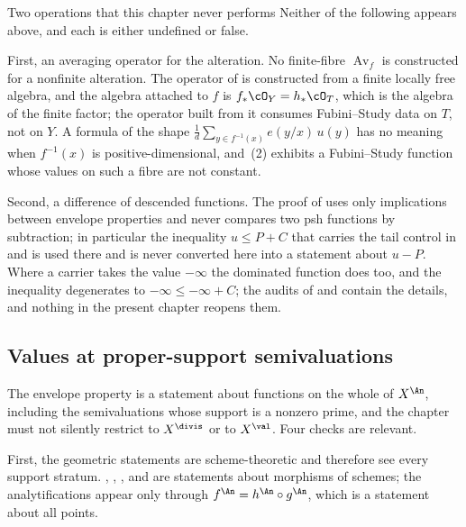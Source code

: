 \begin{warning}{Two operations that this chapter never performs}
\label{warn:ch42-forbidden}
Neither of the following appears above, and each is either undefined or
false.

First, an averaging operator for the alteration.  No finite-fibre
$\operatorname{Av}_f$ is constructed for a nonfinite alteration.  The operator of 
is constructed from a finite locally free algebra, and the algebra attached
to $f$ is $f_*\cO_Y=h_*\cO_T$, which is the algebra of the finite
factor; the operator built from it consumes Fubini--Study data on $T$, not
on $Y$.  A formula of the shape
$\frac1d\sum_{y\in f^{-1}(x)}e(y/x)\,u(y)$ has no meaning when
$f^{-1}(x)$ is positive-dimensional, and
\,(2) exhibits a Fubini--Study function whose
values on such a fibre are not constant.

Second, a difference of descended functions.  The proof of
 uses only implications between envelope
properties and never compares two psh functions by subtraction; in
particular the inequality $u\le P+C$ that carries the tail control in
 and  is used there
and is never converted here into a statement about $u-P$.  Where a carrier
takes the value $-\infty$ the dominated function does too, and the
inequality degenerates to $-\infty\le-\infty+C$; the audits of
 and  contain the details, and
nothing in the present chapter reopens them.
\end{warning}

\subsection{Values at proper-support semivaluations}
\label{sec:ch42-proper-support}

The envelope property is a statement about functions on the whole of
$X^{\An}$, including the semivaluations whose support is a nonzero prime,
and the chapter must not silently restrict to $X^{\divis}$ or to
$X^{\val}$.  Four checks are relevant.

First, the geometric statements are scheme-theoretic and therefore see every
support stratum.  ,
, ,
 and  are
statements about morphisms of schemes; the analytifications appear only
through $f^{\An}=h^{\An}\circ g^{\An}$, which is a statement about all
points.

